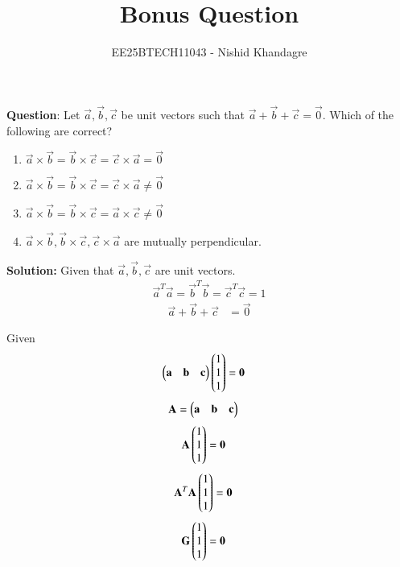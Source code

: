 \documentclass[journal]{IEEEtran}
\title{Bonus Question}
\author{EE25BTECH11043 - Nishid Khandagre} %
\begin{document}
\maketitle

\renewcommand{\thefigure}{\theenumi}
\renewcommand{\thetable}{\theenumi}


\textbf{Question}:
Let $\vec{a}, \vec{b}, \vec{c}$ be unit vectors such that $\vec{a} + \vec{b} + \vec{c} = \vec{0}$. Which of the following are correct?
\begin{enumerate}
    \item $\vec{a} \times \vec{b} = \vec{b} \times \vec{c} = \vec{c} \times \vec{a} = \vec{0}$
    \item $\vec{a} \times \vec{b} = \vec{b} \times \vec{c} = \vec{c} \times \vec{a} \neq \vec{0}$
    \item $\vec{a} \times \vec{b} = \vec{b} \times \vec{c} = \vec{a} \times \vec{c} \neq \vec{0}$
    \item $\vec{a} \times \vec{b}, \vec{b} \times \vec{c}, \vec{c} \times \vec{a}$ are mutually perpendicular.
\end{enumerate}

\textbf{Solution: }
Given that $\vec{a}, \vec{b}, \vec{c}$ are unit vectors.
\begin{align}
    \vec{a}^T \vec{a} = \vec{b}^T \vec{b} = \vec{c}^T \vec{c} = 1
\end{align}
\begin{align}
    \vec{a} + \vec{b} + \vec{c} &= \vec{0}
\end{align}


 Given 
 \begin{align}
    \begin{pmatrix}\mathbf{a} & \mathbf{b} & \mathbf{c}\end{pmatrix}\begin{pmatrix}1\\1\\1\end{pmatrix}&=\mathbf{0}
\end{align}
\begin{align}
\mathbf{A}&=\begin{pmatrix}\mathbf{a} & \mathbf{b} & \mathbf{c}\end{pmatrix}
\end{align}
\begin{align}
\mathbf{A}\begin{pmatrix}1\\1\\1\end{pmatrix}&=\mathbf{0}
\end{align}
\begin{align}
\mathbf{A}^T\mathbf{A}\begin{pmatrix}1\\1\\1\end{pmatrix}&=\mathbf{0} 
\end{align}
\begin{align}
\mathbf{G}\begin{pmatrix}1\\1\\1\end{pmatrix}&=\mathbf{0}
\end{align}
\end{document}
